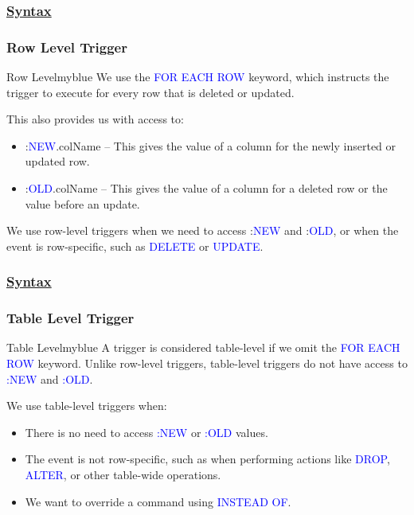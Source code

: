 \subsubsection*{\underline{Syntax}}





\subsubsection{Row Level Trigger}

\begin{prettyBox}{Row Level}{myblue}
We use the \textcolor{blue}{FOR EACH ROW} keyword, which instructs the trigger
to execute for every row that is deleted or updated.

This also provides us with access to:
\begin{itemize}
    \item :\textcolor{blue}{NEW}.colName – This gives the value of a column for the newly inserted or updated row.
    \item :\textcolor{blue}{OLD}.colName – This gives the value of a column for a deleted row or the value before an update.
\end{itemize}

We use row-level triggers when we need to access :\textcolor{blue}{NEW} and :\textcolor{blue}{OLD}, or when the event is row-specific, such as \textcolor{blue}{DELETE} or \textcolor{blue}{UPDATE}.
\end{prettyBox}\newpage

\subsubsection*{\underline{Syntax}}






\subsubsection{Table Level Trigger}

\begin{prettyBox}{Table Level}{myblue}
A trigger is considered table-level if we omit the \textcolor{blue}{FOR EACH ROW} keyword. Unlike row-level triggers, table-level triggers do not have access to \textcolor{blue}{:NEW} and \textcolor{blue}{:OLD}.

\vspace{0.15cm}
We use table-level triggers when:
\begin{itemize}
    \item There is no need to access \textcolor{blue}{:NEW} or \textcolor{blue}{:OLD} values.
    \item The event is not row-specific, such as when performing actions like \textcolor{blue}{DROP}, \textcolor{blue}{ALTER}, or other table-wide operations.
    \item We want to override a command using \textcolor{blue}{INSTEAD OF}.
\end{itemize}
\end{prettyBox}

